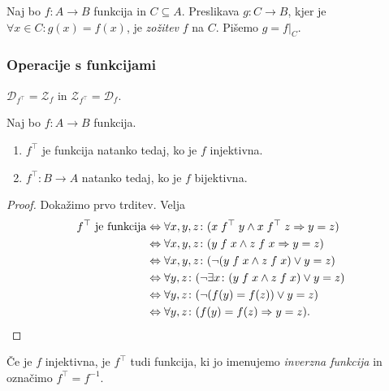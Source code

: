 \documentclass[12pt, a4paper]{article}
\renewcommand{\implies}{\Rightarrow}
\renewcommand{\iff}{\Leftrightarrow}
\begin{document}
\begin{definicija}
Naj bo $f\colon A\to B$ funkcija in $C\subseteq A$. Preslikava $g\colon C\to B$, kjer je $\forall x\in C\colon g(x)=f(x)$, je \emph{zožitev} $f$ na $C$. Pišemo $g=f|_C$.
\end{definicija}

\newpage

\subsubsection{Operacije s funkcijami}

\begin{trditev}
$\mathcal{D}_{f^\top}=\mathcal{Z}_f$ in $\mathcal{Z}_{f^\top}=\mathcal{D}_f$.
\end{trditev}

\obvs

\begin{trditev}
Naj bo $f\colon A\to B$ funkcija.

\begin{enumerate}
\item $f^\top$ je funkcija natanko tedaj, ko je $f$ injektivna.
\item $f^\top\colon B\to A$ natanko tedaj, ko je $f$ bijektivna.
\end{enumerate}
\end{trditev}

\begin{proof}
Dokažimo prvo trditev. Velja
\begin{align*}
f^\top~\text{je funkcija}&\iff \forall x,y,z\colon(x\rel{f^\top}y\land x\rel{f^\top} z\implies y=z)
\\
&\iff\forall x,y,z\colon(y\rel{f}x\land z\rel{f}x\implies y=z)
\\
&\iff\forall x,y,z\colon(\neg(y\rel{f}x\land z\rel{f}x)\lor y=z)
\\
&\iff\forall y,z\colon(\neg\exists x\colon(y\rel{f}x\land z\rel{f}x)\lor y=z)
\\
&\iff\forall y,z\colon(\neg(f(y)=f(z))\lor y=z)
\\
&\iff\forall y,z\colon(f(y)=f(z)\implies y=z).\qedhere
\end{align*}
\end{proof}

\begin{definicija}
Če je $f$ injektivna, je $f^\top$ tudi funkcija, ki jo imenujemo \emph{inverzna funkcija} in označimo $f^\top=f^{-1}$.
\end{definicija}
\end{document}
